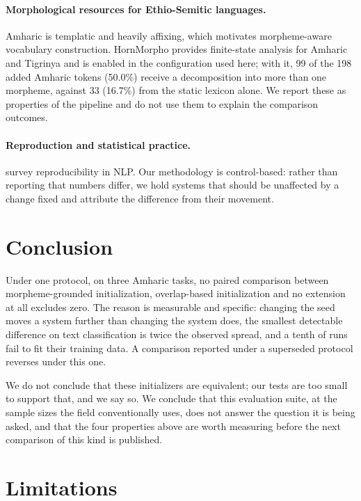 \documentclass[11pt]{article}
\begin{document}
\paragraph{Morphological resources for Ethio-Semitic languages.} Amharic is
templatic and heavily affixing, which motivates morpheme-aware vocabulary
construction. HornMorpho \citep{gasser-2011-hornmorpho} provides finite-state
analysis for Amharic and Tigrinya and is enabled in the configuration used
here; with it, 99 of the 198 added Amharic tokens (50.0\%) receive a
decomposition into more than one morpheme, against 33 (16.7\%) from the
static lexicon alone. We report these as properties of the pipeline and do
not use them to explain the comparison outcomes.

\paragraph{Reproduction and statistical practice.}
\citet{belz-etal-2021-systematic} survey reproducibility in NLP. Our
methodology is control-based: rather than reporting that numbers differ, we
hold systems that should be unaffected by a change fixed and attribute the
difference from their movement.

\section{Conclusion}

Under one protocol, on three Amharic tasks, no paired comparison between
morpheme-grounded initialization, overlap-based initialization and no
extension at all excludes zero. The reason is measurable and specific:
changing the seed moves a system further than changing the system does, the
smallest detectable difference on text classification is twice the observed
spread, and a tenth of runs fail to fit their training data. A comparison
reported under a superseded protocol reverses under this one.

We do not conclude that these initializers are equivalent; our tests are too
small to support that, and we say so. We conclude that this evaluation suite,
at the sample sizes the field conventionally uses, does not answer the
question it is being asked, and that the four properties above are worth
measuring before the next comparison of this kind is published.

\section*{Limitations}
\label{sec:limitations}
\end{document}
